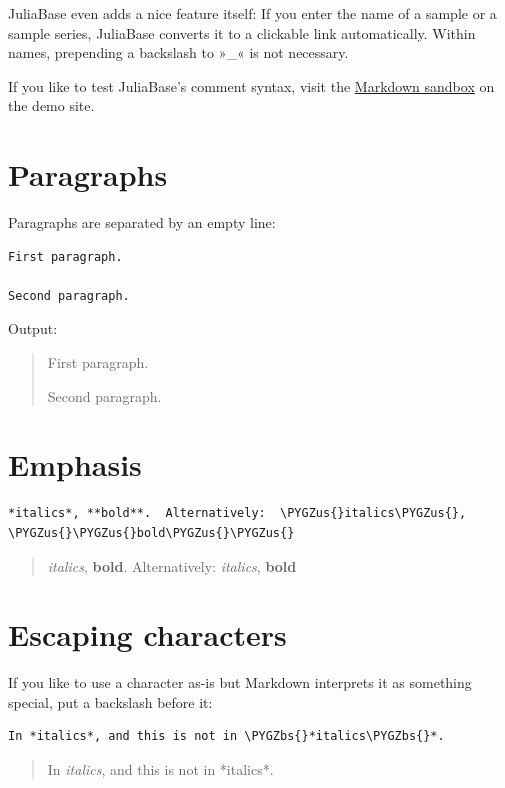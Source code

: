 \documentclass[a4paper,11pt,english]{sphinxmanual}
\def\PYGZbs{\char`\\}
\def\PYGZus{\char`\_}
\begin{document}
JuliaBase even adds a nice feature itself: If you enter the name of a sample or a
sample series, JuliaBase converts it to a clickable link automatically.  Within
names, prepending a backslash to »\_« is not necessary.

If you like to test JuliaBase's comment syntax, visit the \href{http://demo.juliabase.org/markdown}{Markdown sandbox} on the demo site.


\section{Paragraphs}
\label{markdown:paragraphs}
Paragraphs are separated by an empty line:

\begin{Verbatim}[commandchars=\\\{\},formatcom=\scriptsize]
First paragraph.

Second paragraph.
\end{Verbatim}

Output:
\begin{quote}

First paragraph.

Second paragraph.
\end{quote}


\section{Emphasis}
\label{markdown:emphasis}
\begin{Verbatim}[commandchars=\\\{\},formatcom=\scriptsize]
*italics*, **bold**.  Alternatively:  \PYGZus{}italics\PYGZus{}, \PYGZus{}\PYGZus{}bold\PYGZus{}\PYGZus{}
\end{Verbatim}
\begin{quote}

\emph{italics}, \textbf{bold}.  Alternatively: \emph{italics}, \textbf{bold}
\end{quote}


\section{Escaping characters}
\label{markdown:escaping-characters}
If you like to use a character as-is but Markdown interprets it as something
special, put a backslash before it:

\begin{Verbatim}[commandchars=\\\{\},formatcom=\scriptsize]
In *italics*, and this is not in \PYGZbs{}*italics\PYGZbs{}*.
\end{Verbatim}
\begin{quote}

In \emph{italics}, and this is not in *italics*.
\end{quote}
\end{document}

